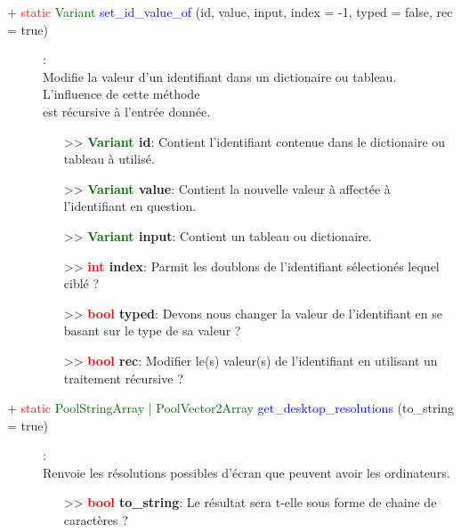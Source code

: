 \documentclass[a4paper, 11pt]{article}
\begin{document}
	\begin{description}
		\item [+ \textcolor{red}{static} \textcolor{darkgreen}{Variant} \textcolor{blue}{set\_id\_value\_of} 
		(id, value, input, index = -1, typed = false, rec = true)]: \\Modifie la valeur d'un identifiant 
		dans un dictionaire ou tableau. L'influence de cette méthode \\est récursive à l'entrée donnée.
		\begin{itemize}
			\item[>> \textbf{\textcolor{darkgreen}{Variant} id}:] Contient l'identifiant contenue dans le 
			dictionaire ou tableau à utilisé.
			\item[>> \textbf{\textcolor{darkgreen}{Variant} value}:] Contient la nouvelle valeur à affectée
			à l'identifiant en question.
			\item[>> \textbf{\textcolor{darkgreen}{Variant} input}:] Contient un tableau ou dictionaire.
			\item[>> \textbf{\textcolor{red}{int} index}:] Parmit les doublons de l'identifiant sélectionés
			lequel ciblé ?
			\item[>> \textbf{\textcolor{red}{bool} typed}:] Devons nous changer la valeur de l'identifiant 
			en se basant sur le type de sa valeur ?
			\item [>> \textbf{\textcolor{red}{bool} rec}:] Modifier le(s) valeur(s) de l'identifiant en 
			utilisant un traitement récursive ?\\
		\end{itemize}
	\end{description}
	\begin{description}
		\item [+ \textcolor{red}{static} \textcolor{darkgreen}{PoolStringArray | PoolVector2Array} 
		\textcolor{blue}{get\_desktop\_resolutions} (to\_string = true)]: \\Renvoie les résolutions 
		possibles d'écran que peuvent avoir les ordinateurs.
		\begin{itemize}
			\item[>> \textbf{\textcolor{red}{bool} to\_string}:] Le résultat sera t-elle sous forme de 
			chaine de caractères ?\\
		\end{itemize}
	\end{description}
\end{document}
